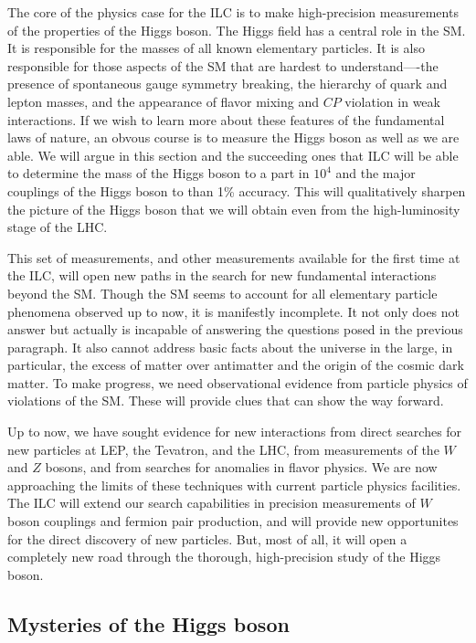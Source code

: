 

The core of the physics case for the ILC is to make high-precision
 measurements of the properties of the Higgs boson.    The Higgs
 field has a central role in 
 the SM.  It is responsible for the masses of all known
 elementary particles.
  It is also responsible for those aspects of the SM that are
 hardest to  understand----the
presence of spontaneous gauge symmetry breaking, the  hierarchy of quark and lepton masses, and the appearance of flavor mixing and $CP$ violation in weak 
interactions.
If we wish to learn more about these features of the fundamental laws of nature, an obvous course is to measure the Higgs boson as well as we are able.  We will argue in this section and the succeeding ones that ILC will be able to determine the mass of the Higgs boson to a part in $10^4$ and the major couplings of the Higgs boson to than 1\% accuracy.   This will qualitatively sharpen the picture of the Higgs boson that we will obtain even from the high-luminosity stage of the LHC. 

This set of measurements, and other measurements available for the first time at the ILC, will open new paths in the search for new fundamental interactions beyond the SM. 
Though the SM seems to account for all elementary particle phenomena observed up to now, it is manifestly incomplete.   It not only does not answer but actually is incapable of answering the questions posed in the previous paragraph.  It also cannot address basic facts about the universe in the large, in particular, the excess of matter over antimatter and the origin of the cosmic dark matter.  To make progress, we need observational evidence from particle physics of violations of the SM.  These will provide clues that can show the way forward.

Up to now, we have sought evidence for new interactions from direct searches for new particles at LEP, the Tevatron, and the LHC, from measurements of the $W$ and $Z$ bosons, and from searches for anomalies in flavor physics.  We are now approaching the limits of these techniques with current particle physics facilities.  The ILC will 
extend our search capabilities in precision measurements of $W$ boson couplings and fermion pair production, and will provide new opportunites for the direct discovery of new particles.  But, most of all, it will open a completely new road through the thorough, high-precision study of the Higgs boson. 


\subsection{Mysteries of the Higgs boson}

